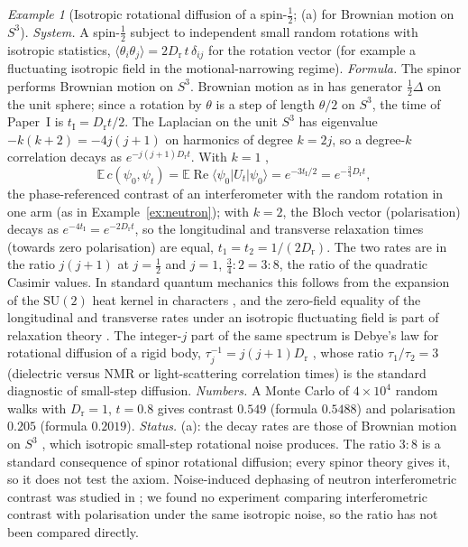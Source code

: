 \documentclass[aps,pra,onecolumn,superscriptaddress,nofootinbib,10pt]{revtex4-2}
\theoremstyle{definition}
\theoremstyle{remark}
\newtheorem{example}[theorem]{Example}
\newcommand{\SU}{\mathrm{SU}}
\begin{document}
\begin{example}[Isotropic rotational diffusion of a spin-$\tfrac12$; (a) for Brownian motion on $S^3$]\label{ex:diffusion}
\emph{System.}  A spin-$\tfrac12$ subject to independent small random rotations with isotropic statistics,
$\langle\theta_i\theta_j\rangle=2D_{\mathrm r}\,t\,\delta_{ij}$ for the rotation vector (for example a fluctuating isotropic field in
the motional-narrowing regime).
\emph{Formula.}  The spinor performs Brownian motion on $S^3$.  Brownian motion as in \cite[Prop.~7.4]{PaperI} has generator
$\tfrac12\Delta$ on the unit sphere; since a rotation by $\theta$ is a step of length $\theta/2$ on $S^3$, the time of
Paper~I is $t_{\mathrm I}=D_{\mathrm r}t/2$.  The Laplacian on the unit $S^3$ has eigenvalue $-k(k+2)=-4j(j+1)$ on
harmonics of degree $k=2j$, so a degree-$k$ correlation decays as $e^{-j(j+1)D_{\mathrm r}t}$.  With $k=1$ \cite[Prop.~7.4]{PaperI},
\[
\mathbb E\,c(\psi_0,\psi_t)=\mathbb E\operatorname{Re}\langle\psi_0|U_t|\psi_0\rangle=e^{-3t_{\mathrm I}/2}=e^{-\frac34D_{\mathrm r}t},
\]
the phase-referenced contrast of an interferometer with the random rotation in one arm (as in
Example~\ref{ex:neutron}); with $k=2$, the Bloch vector (polarisation) decays as $e^{-4t_{\mathrm I}}=e^{-2D_{\mathrm r}t}$, so
the longitudinal and transverse relaxation times (towards zero polarisation) are equal,
$t_1=t_2=1/(2D_{\mathrm r})$.  The two rates are in the ratio $j(j+1)$ at $j=\tfrac12$ and $j=1$, $\tfrac34:2=3:8$, the
ratio of the quadratic Casimir values.  In standard quantum mechanics this follows from the expansion
of the $\SU(2)$ heat kernel in characters \cite{ex-Favro60}, and the zero-field equality of the
longitudinal and transverse rates under an isotropic fluctuating field is part of relaxation theory
\cite{ex-Abragam61}.  The integer-$j$ part of the same spectrum is Debye's law for rotational diffusion of a
rigid body, $\tau_j^{-1}=j(j+1)D_{\mathrm r}$ \cite{ex-Debye29,ex-Favro60}, whose ratio $\tau_1/\tau_2=3$ (dielectric versus NMR
or light-scattering correlation times) is the standard diagnostic of small-step diffusion.
\emph{Numbers.}  A Monte Carlo of $4\times10^4$ random walks with $D_{\mathrm r}=1$, $t=0.8$ gives contrast $0.549$
(formula $0.5488$) and polarisation $0.205$ (formula $0.2019$).
\emph{Status.}  (a): the decay rates are those of Brownian motion on $S^3$ \cite[Prop.~7.4]{PaperI}, which isotropic small-step
rotational noise produces.  The ratio $3:8$ is a standard consequence of spinor rotational diffusion;
every spinor theory gives it, so it does not test the axiom.  Noise-induced dephasing of neutron
interferometric contrast was studied in \cite{ex-Sulyok10}; we found no experiment comparing
interferometric contrast with polarisation under the same isotropic noise, so the ratio has not been
compared directly.
\end{example}
\end{document}
